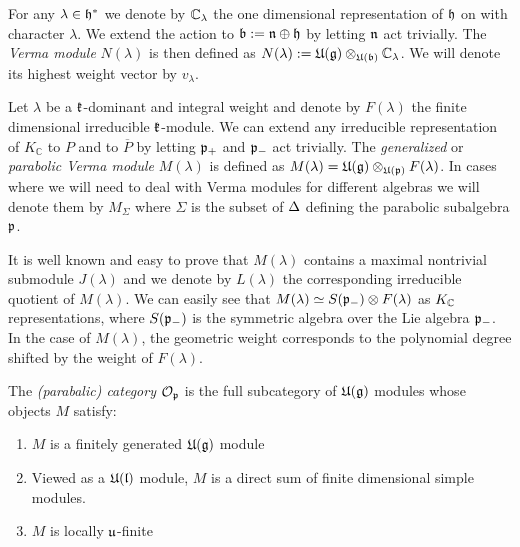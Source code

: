 For any $\lambda\in\mathfrak{h}^*$ we denote by $\mathbb{C}_\lambda$ the one dimensional representation of $\mathfrak{h}$ on with character $\lambda$. We extend the action to $\mathfrak{b} := \mathfrak{n}\oplus\mathfrak{h}$ by letting $\mathfrak{n}$ act trivially. The \emph{Verma module} $N(\lambda)$ is then defined as $N(\lambda) := \mathfrak{U(g)}\otimes_{\mathfrak{U(b)}} \mathbb{C}_\lambda$. We will denote its highest weight vector by $v_\lambda$.

Let $\lambda$ be a $\mathfrak{k}$-dominant and integral weight and denote by $F(\lambda)$ the finite dimensional irreducible $\mathfrak{k}$-module.  We can extend any irreducible representation of $K_\mathbb{C}$ to $P$ and to $\overline{P}$ by letting $\mathfrak{p}_+$ and $\mathfrak{p}_-$ act trivially. The \emph{generalized} or \emph{parabolic Verma module} $M(\lambda)$ is defined as $M(\lambda) = \mathfrak{U}(\mathfrak{g}) \otimes_{\mathfrak{U}(\mathfrak{p})} F(\lambda)$. In cases where we will need to deal with Verma modules for different algebras we will denote them by $M_\Sigma$ where $\Sigma$ is the subset of $\Delta$ defining the parabolic subalgebra $\mathfrak{p}$. 

 It is well known and easy to prove that $M(\lambda)$ contains a maximal nontrivial submodule $J(\lambda)$ and we denote by $L(\lambda)$ the corresponding irreducible quotient of $M(\lambda)$. We can easily see that $M(\lambda) \simeq S(\mathfrak{p}_-)\otimes F(\lambda)$ as $K_{\mathbb{C}}$ representations, where $S(\mathfrak{p}_-)$ is the symmetric algebra  over the Lie algebra $\mathfrak{p}_-$.
In the case of $M(\lambda)$, the geometric weight corresponds to the polynomial degree shifted by the weight of $F(\lambda)$.%

The \emph{(parabalic) category $\mathcal{O}_{\mathfrak{p}}$} is the full subcategory of $\mathfrak{U(g)}$ modules whose objects $M$ satisfy:
\begin{enumerate}
\item $M$ is a finitely generated $\mathfrak{U(g)}$ module
\item Viewed as a $\mathfrak{U(l)}$ module, $M$ is a direct sum of finite dimensional simple modules.
\item $M$ is locally $\mathfrak{u}$-finite
\end{enumerate}

